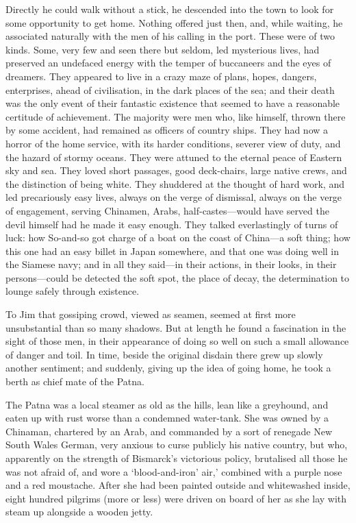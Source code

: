 Directly he could walk without a stick, he descended into the town to look for some opportunity to get home. Nothing offered just then, and, while waiting, he associated naturally with the men of his calling in the port. These were of two kinds. Some, very few and seen there but seldom, led mysterious lives, had preserved an undefaced energy with the temper of buccaneers and the eyes of dreamers. They appeared to live in a crazy maze of plans, hopes, dangers, enterprises, ahead of civilisation, in the dark places of the sea; and their death was the only event of their fantastic existence that seemed to have a reasonable certitude of achievement. The majority were men who, like himself, thrown there by some accident, had remained as officers of country ships. They had now a horror of the home service, with its harder conditions, severer view of duty, and the hazard of stormy oceans. They were attuned to the eternal peace of Eastern sky and sea. They loved short passages, good deck-chairs, large native crews, and the distinction of being white. They shuddered at the thought of hard work, and led precariously easy lives, always on the verge of dismissal, always on the verge of engagement, serving Chinamen, Arabs, half-castes—would have served the devil himself had he made it easy enough. They talked everlastingly of turns of luck: how So-and-so got charge of a boat on the coast of China—a soft thing; how this one had an easy billet in Japan somewhere, and that one was doing well in the Siamese navy; and in all they said—in their actions, in their looks, in their persons—could be detected the soft spot, the place of decay, the determination to lounge safely through existence.

To Jim that gossiping crowd, viewed as seamen, seemed at first more unsubstantial than so many shadows. But at length he found a fascination in the sight of those men, in their appearance of doing so well on such a small allowance of danger and toil. In time, beside the original disdain there grew up slowly another sentiment; and suddenly, giving up the idea of going home, he took a berth as chief mate of the Patna.

The Patna was a local steamer as old as the hills, lean like a greyhound, and eaten up with rust worse than a condemned water-tank. She was owned by a Chinaman, chartered by an Arab, and commanded by a sort of renegade New South Wales German, very anxious to curse publicly his native country, but who, apparently on the strength of Bismarck’s victorious policy, brutalised all those he was not afraid of, and wore a ‘blood-and-iron’ air,’ combined with a purple nose and a red moustache. After she had been painted outside and whitewashed inside, eight hundred pilgrims (more or less) were driven on board of her as she lay with steam up alongside a wooden jetty.

